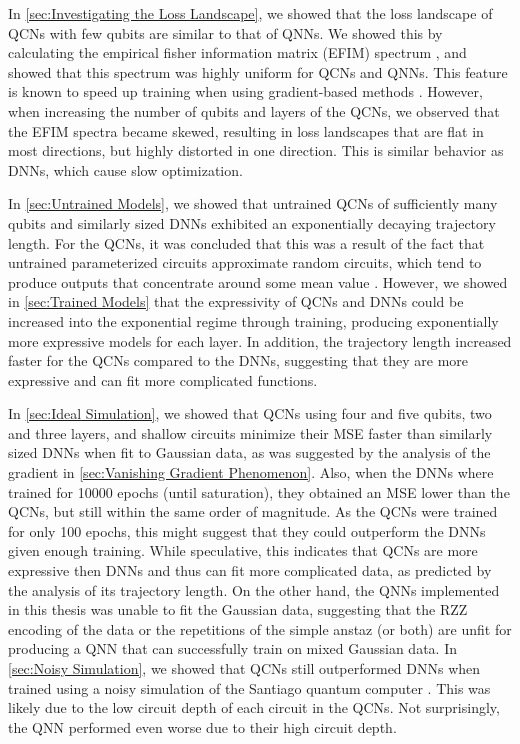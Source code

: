In \cref{sec:Investigating the Loss Landscape}, we showed that the loss landscape of QCNs with few qubits are similar to that of QNNs. We showed this by calculating the empirical fisher information matrix (EFIM) spectrum \cite{karakida2019universal}, and showed that this spectrum was highly uniform for QCNs and QNNs. This feature is known to speed up training when using gradient-based methods \citet{karakida2019universal}. However, when increasing the number of qubits and layers of the QCNs, we observed that the EFIM spectra became skewed, resulting in loss landscapes that are flat in most directions, but highly distorted in one direction. This is similar behavior as DNNs, which cause slow optimization.

In \cref{sec:Untrained Models}, we showed that untrained QCNs of sufficiently many qubits and similarly sized DNNs exhibited an exponentially decaying trajectory length. For the QCNs, it was concluded that this was a result of the fact that untrained parameterized circuits approximate random circuits, which tend to produce outputs that concentrate around some mean value \cite{McClean_2018}. However, we showed in \cref{sec:Trained Models} that the expressivity of QCNs and DNNs could be increased into the exponential regime through training, producing exponentially more expressive models for each layer. In addition, the trajectory length increased faster for the QCNs compared to the DNNs, suggesting that they are more expressive and can fit more complicated functions.

In \cref{sec:Ideal Simulation}, we showed that QCNs using four and five qubits, two and three layers, and shallow circuits minimize their MSE faster than similarly sized DNNs when fit to Gaussian data, as was suggested by the analysis of the gradient in \cref{sec:Vanishing Gradient Phenomenon}. Also, when the DNNs where trained for 10000 epochs (until saturation), they obtained an MSE lower than the QCNs, but still within the same order of magnitude. As the QCNs were trained for only 100 epochs, this might suggest that they could outperform the DNNs given enough training. While speculative, this indicates that QCNs are more expressive then DNNs and thus can fit more complicated data, as predicted by the analysis of its trajectory length. On the other hand, the QNNs implemented in this thesis was unable to fit the Gaussian data, suggesting that the RZZ encoding of the data or the repetitions of the simple anstaz (or both) are unfit for producing a QNN that can successfully train on mixed Gaussian data. In \cref{sec:Noisy Simulation}, we showed that QCNs still outperformed DNNs when trained using a noisy simulation of the Santiago quantum computer \cite{santiago}. This was likely due to the low circuit depth of each circuit in the QCNs. Not surprisingly, the QNN performed even worse due to their high circuit depth.   

